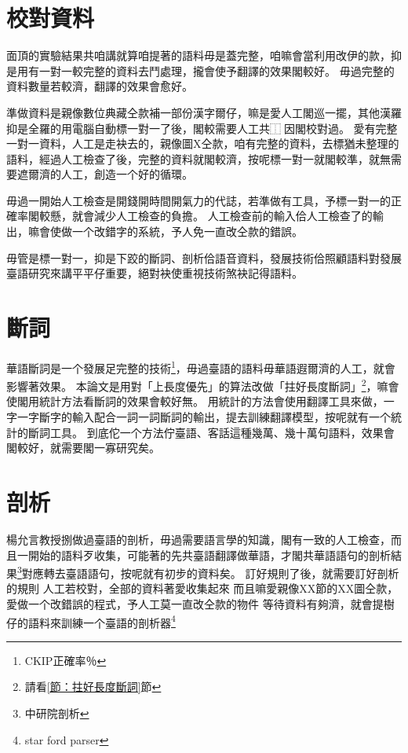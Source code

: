 \documentclass[final,oneside,onecolumn,12pt,a4paper]{book}%
\begin{document}
\section{校對資料}
\label{節：校對資料}
面頂的實驗結果共咱講就算咱提著的語料毋是蓋完整，咱嘛會當利用改伊的款，抑是用有一對一較完整的資料去鬥處理，攏會使予翻譯的效果閣較好。
毋過完整的資料數量若較濟，翻譯的效果會愈好。

準做資料是親像數位典藏仝款補一部份漢字爾仔，嘛是愛人工閣巡一擺，其他漢羅抑是全羅的用電腦自動標一對一了後，閣較需要人工共⿰因閣校對過。
愛有完整一對一資料，人工是走袂去的，親像圖X仝款，咱有完整的資料，去標猶未整理的語料，經過人工檢查了後，完整的資料就閣較濟，按呢標一對一就閣較準，就無需要遮爾濟的人工，創造一个好的循環。

毋過一開始人工檢查是開錢開時間開氣力的代誌，若準做有工具，予標一對一的正確率閣較懸，就會減少人工檢查的負擔。
人工檢查前的輸入佮人工檢查了的輸出，嘛會使做一个改錯字的系統，予人免一直改仝款的錯誤。

毋管是標一對一，抑是下跤的斷詞、剖析佮語音資料，發展技術佮照顧語料對發展臺語研究來講平平仔重要，絕對袂使重視技術煞袂記得語料。

\section{斷詞}
\label{節：斷詞}
華語斷詞是一个發展足完整的技術\footnote{CKIP正確率％}，毋過臺語的語料毋華語遐爾濟的人工，就會影響著效果。
本論文是用對「上長度優先」的算法改做「拄好長度斷詞」\footnote{請看\ref{節：拄好長度斷詞}節}，嘛會使閣用統計方法看斷詞的效果會較好無。
用統計的方法會使用翻譯工具來做，一字一字斷字的輸入配合一詞一詞斷詞的輸出，提去訓練翻譯模型，按呢就有一个統計的斷詞工具。
到底佗一个方法佇臺語、客話這種幾萬、幾十萬句語料，效果會閣較好，就需要閣一寡研究矣。
\section{剖析}
\label{節：剖析}
楊允言教授捌做過臺語的剖析，毋過需要語言學的知識，閣有一致的人工檢查，而且一開始的語料歹收集，可能著的先共臺語翻譯做華語，才閣共華語語句的剖析結果\footnote{中研院剖析}對應轉去臺語語句，按呢就有初步的資料矣。
訂好規則了後，就需要訂好剖析的規則
人工若校對，全部的資料著愛收集起來
而且嘛愛親像XX節的XX圖仝款，愛做一个改錯誤的程式，予人工莫一直改仝款的物件
等待資料有夠濟，就會提樹仔的語料來訓練一个臺語的剖析器\footnote{star ford parser}
\end{document}

